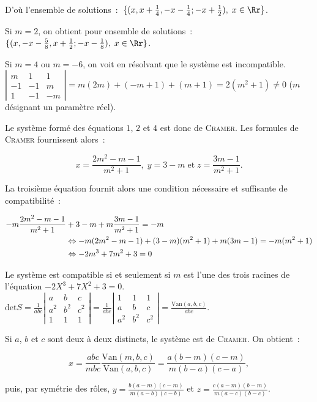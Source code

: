 {{D'où l'ensemble de solutions~:~$\{(x,x+\frac{1}{4},-x-\frac{1}{4};-x+\frac{1}{2}),\;x\in\Rr\}$.

Si $m=2$, on obtient pour ensemble de solutions~:~$\{(x,-x-\frac{5}{8},x+\frac{1}{2};-x-\frac{1}{8}),\;x\in\Rr\}$.

Si $m=4$ ou $m=-6$, on voit en résolvant que le système est incompatible.
$\left|
\begin{array}{ccc}
m&1&1\\
-1&-1&m\\
1&-1&-m
\end{array}
\right|=m(2m)+(-m+1)+(m+1)=2(m^2+1)\neq 0$ ($m$ désignant un paramètre réel).

Le système formé des équations $1$, $2$ et $4$ est donc de \textsc{Cramer}. Les formules de \textsc{Cramer} fournissent alors~:

$$x=\frac{2m^2-m-1}{m^2+1},\;y=3-m\;\mbox{et}\;z=\frac{3m-1}{m^2+1}.$$

La troisième équation fournit alors une condition nécessaire et suffisante de compatibilité~:

\begin{align*}\ensuremath
-m\frac{2m^2-m-1}{m^2+1}&+3-m+m\frac{3m-1}{m^2+1}=-m\\
 &\Leftrightarrow-m(2m^2-m-1)+(3-m)(m^2+1)+m(3m-1)=-m(m^2+1)\\
 &\Leftrightarrow-2m^3+7m^2+3= 0
\end{align*}

Le système est compatible si et seulement si $m$ est l'une des trois racines de l'équation $-2X^3+7X^2+3=0$.
$\mbox{det}S=\frac{1}{abc}\left|
\begin{array}{ccc}
a&b&c\\
a^2&b^2&c^2\\
1&1&1
\end{array}
\right|=\frac{1}{abc}\left|
\begin{array}{ccc}
1&1&1\\
a&b&c\\
a^2&b^2&c^2
\end{array}
\right|=\frac{\mbox{Van}(a,b,c)}{abc}$.

Si $a$, $b$ et $c$ sont deux à deux distincts, le système est de \textsc{Cramer}. On obtient~:

$$x=\frac{abc}{mbc}\frac{\mbox{Van}(m,b,c)}{\mbox{Van}(a,b,c)}=\frac{a(b-m)(c-m)}{m(b-a)(c-a)},$$

puis, par symétrie des rôles, $y=\frac{b(a-m)(c-m)}{m(a-b)(c-b)}$ et $z=\frac{c(a-m)(b-m)}{m(a-c)(b-c)}$.

}}
